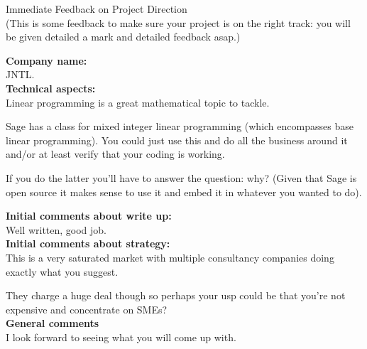 \documentclass{article}
\begin{document}
\begin{center}
\Huge{Immediate Feedback on Project Direction}\\
\tiny{(This is some feedback to make sure your project is on the right track: you will be given detailed a mark and detailed feedback asap.)}
\end{center}


\normalsize
\textbf{Company name:}\\

JNTL. \\

\textbf{Technical aspects:}\\

Linear programming is a great mathematical topic to tackle.

Sage has a class for mixed integer linear programming (which encompasses base linear programming).
You could just use this and do all the business around it and/or at least verify that your coding is working.

If you do the latter you'll have to answer the question: why? (Given that Sage is open source it makes sense to use it and embed it in whatever you wanted to do).

\textbf{Initial comments about write up:}\\

Well written, good job.\\

\textbf{Initial comments about strategy:}\\

This is a very saturated market with multiple consultancy companies doing exactly what you suggest.

They charge a huge deal though so perhaps your usp could be that you're not expensive and concentrate on SMEs?\\

\textbf{General comments}\\

I look forward to seeing what you will come up with.
\end{document}
